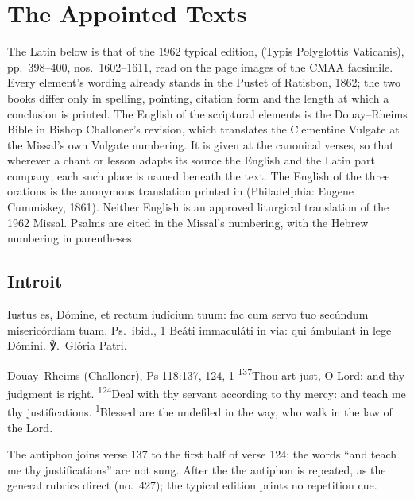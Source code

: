 \section{The Appointed Texts}
\label{sec:appointed-texts}

The Latin below is that of the 1962 typical edition, 
(Typis Polyglottis Vaticanis), pp.~398--400, nos.~1602--1611, read on the page
images of the CMAA facsimile. Every element's wording already stands in the
Pustet  of Ratisbon, 1862; the two books differ only in
spelling, pointing, citation form and the length at which a conclusion is
printed. The English of the scriptural elements is the Douay--Rheims Bible in
Bishop Challoner's revision, which translates the Clementine Vulgate at the
Missal's own Vulgate numbering. It is given at the canonical verses, so that
wherever a chant or lesson adapts its source the English and the Latin part
company; each such place is named beneath the text. The English of the three
orations is the anonymous translation printed in  (Philadelphia:
Eugene Cummiskey, 1861). Neither English is an approved liturgical
translation of the 1962 Missal. Psalms are cited in the Missal's numbering,
with the Hebrew numbering in parentheses.

\subsection{Introit}
\label{proper-introit}


\begin{latinproper}
Iustus es, Dómine, et rectum iudícium tuum: fac cum servo tuo secúndum
misericórdiam tuam. \textnormal{Ps.\ ibid., 1} Beáti immaculáti in via: qui
ámbulant in lege Dómini. ℣.~Glória Patri.
\end{latinproper}

\begin{englishwitness}{Douay--Rheims (Challoner), Ps 118:137, 124, 1}
\textsuperscript{137}Thou art just, O Lord: and thy judgment is right.
\textsuperscript{124}Deal with thy servant according to thy mercy: and teach me
thy justifications. \textsuperscript{1}Blessed are the undefiled in the way,
who walk in the law of the Lord.
\end{englishwitness}

\noindent The antiphon joins verse 137 to the first half of verse 124; the words ``and
teach me thy justifications'' are not sung. After the  the
antiphon is repeated, as the general rubrics direct (no.~427); the typical
edition prints no repetition cue.

